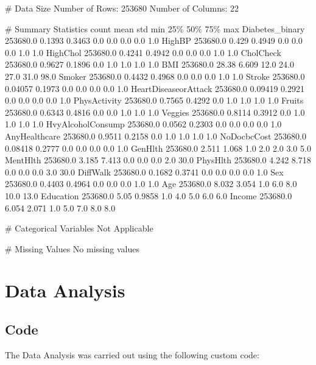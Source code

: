 \documentclass[11pt]{article}
\begin{document}
\begin{codeoutput}
\# Data Size
Number of Rows: 253680
Number of Columns: 22

\# Summary Statistics
	count	mean	std	min	25\%	50\%	75\%	max
Diabetes\_binary	253680.0	0.1393             	0.3463             	0.0	0.0	0.0	0.0	1.0
HighBP	253680.0	0.429             	0.4949            	0.0	0.0	0.0	1.0	1.0
HighChol	253680.0	0.4241            	0.4942            	0.0	0.0	0.0	1.0	1.0
CholCheck	253680.0	0.9627            	0.1896             	0.0	1.0	1.0	1.0	1.0
BMI	253680.0	28.38             	6.609            	12.0	24.0	27.0	31.0	98.0
Smoker	253680.0	0.4432             	0.4968            	0.0	0.0	0.0	1.0	1.0
Stroke	253680.0	0.04057            	0.1973             	0.0	0.0	0.0	0.0	1.0
HeartDiseaseorAttack	253680.0	0.09419            	0.2921             	0.0	0.0	0.0	0.0	1.0
PhysActivity	253680.0	0.7565            	0.4292             	0.0	1.0	1.0	1.0	1.0
Fruits	253680.0	0.6343            	0.4816           	0.0	0.0	1.0	1.0	1.0
Veggies	253680.0	0.8114           	0.3912            	0.0	1.0	1.0	1.0	1.0
HvyAlcoholConsump	253680.0	0.0562             	0.2303             	0.0	0.0	0.0	0.0	1.0
AnyHealthcare	253680.0	0.9511            	0.2158             	0.0	1.0	1.0	1.0	1.0
NoDocbcCost	253680.0	0.08418            	0.2777            	0.0	0.0	0.0	0.0	1.0
GenHlth	253680.0	2.511             	1.068             	1.0	2.0	2.0	3.0	5.0
MentHlth	253680.0	3.185             	7.413            	0.0	0.0	0.0	2.0	30.0
PhysHlth	253680.0	4.242             	8.718           	0.0	0.0	0.0	3.0	30.0
DiffWalk	253680.0	0.1682             	0.3741             	0.0	0.0	0.0	0.0	1.0
Sex	253680.0	0.4403            	0.4964             	0.0	0.0	0.0	1.0	1.0
Age	253680.0	8.032            	3.054            	1.0	6.0	8.0	10.0	13.0
Education	253680.0	5.05             	0.9858            	1.0	4.0	5.0	6.0	6.0
Income	253680.0	6.054            	2.071            	1.0	5.0	7.0	8.0	8.0

\# Categorical Variables
Not Applicable

\# Missing Values
No missing values


\end{codeoutput}

\section{Data Analysis}
\subsection{{Code}}
The Data Analysis was carried out using the following custom code:
\end{document}
